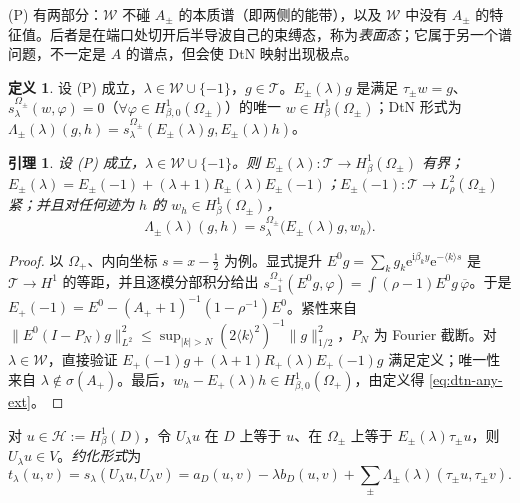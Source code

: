 \documentclass[11pt,a4paper,fontset=fandol]{ctexart}
\newcommand{\ii}{\mathrm{i}}
\newcommand{\ee}{\mathrm{e}}
\newcommand{\Tr}{\mathcal T}
\theoremstyle{plain}
\newtheorem{lemma}[theorem]{引理}
\theoremstyle{definition}
\newtheorem{definition}[theorem]{定义}
\theoremstyle{remark}
\begin{document}
(P) 有两部分：$\mathcal W$ 不碰 $A_\pm$ 的本质谱（即两侧的能带），以及 $\mathcal W$ 中没有 $A_\pm$ 的特征值。后者是在端口处切开后半导波自己的束缚态，称为\emph{表面态}；它属于另一个谱问题，不一定是 $A$ 的谱点，但会使 DtN 映射出现极点。

\begin{definition}
设 (P) 成立，$\lambda\in\mathcal W\cup\{-1\}$，$g\in\Tr$。$E_\pm(\lambda)g$ 是满足 $\tau_\pm w=g$、$s^{\Omega_\pm}_\lambda(w,\varphi)=0$（$\forall\varphi\in H^1_{\beta,0}(\Omega_\pm)$）的唯一 $w\in H^1_\beta(\Omega_\pm)$；DtN 形式为 $\Lambda_\pm(\lambda)(g,h)=s^{\Omega_\pm}_\lambda(E_\pm(\lambda)g,E_\pm(\lambda)h)$。
\end{definition}

\begin{lemma}
\label{lem:extension}
设 (P) 成立，$\lambda\in\mathcal W\cup\{-1\}$。则 $E_\pm(\lambda):\Tr\to H^1_\beta(\Omega_\pm)$ 有界；$E_\pm(\lambda)=E_\pm(-1)+(\lambda+1)R_\pm(\lambda)E_\pm(-1)$；$E_\pm(-1):\Tr\to L^2_\rho(\Omega_\pm)$ 紧；并且对任何迹为 $h$ 的 $w_h\in H^1_\beta(\Omega_\pm)$，
\begin{equation}
\label{eq:dtn-any-ext}
\Lambda_\pm(\lambda)(g,h)=s^{\Omega_\pm}_\lambda\bigl(E_\pm(\lambda)g,w_h\bigr).
\end{equation}
\end{lemma}

\begin{proof}
以 $\Omega_+$、内向坐标 $s=x-\tfrac12$ 为例。显式提升 $E^0g=\sum_kg_k\ee^{\ii\beta_ky}\ee^{-\langle k\rangle s}$ 是 $\Tr\to H^1$ 的等距，并且逐模分部积分给出 $s^{\Omega_+}_{-1}(E^0g,\varphi)=\int(\rho-1)E^0g\,\overline\varphi$。于是 $E_+(-1)=E^0-(A_++1)^{-1}(1-\rho^{-1})E^0$。紧性来自 $\|E^0(I-P_N)g\|_{L^2}^2\le\sup_{|k|>N}(2\langle k\rangle^2)^{-1}\|g\|_{1/2}^2$，$P_N$ 为 Fourier 截断。对 $\lambda\in\mathcal W$，直接验证 $E_+(-1)g+(\lambda+1)R_+(\lambda)E_+(-1)g$ 满足定义；唯一性来自 $\lambda\notin\sigma(A_+)$。最后，$w_h-E_+(\lambda)h\in H^1_{\beta,0}(\Omega_+)$，由定义得 \eqref{eq:dtn-any-ext}。
\end{proof}

对 $u\in\mathcal H:=H^1_\beta(D)$，令 $U_\lambda u$ 在 $D$ 上等于 $u$、在 $\Omega_\pm$ 上等于 $E_\pm(\lambda)\tau_\pm u$，则 $U_\lambda u\in V$。\emph{约化形式}为
\begin{equation}
\label{eq:reduced}
t_\lambda(u,v)=s_\lambda(U_\lambda u,U_\lambda v)=a_D(u,v)-\lambda b_D(u,v)+\sum_\pm\Lambda_\pm(\lambda)(\tau_\pm u,\tau_\pm v).
\end{equation}
\end{document}
